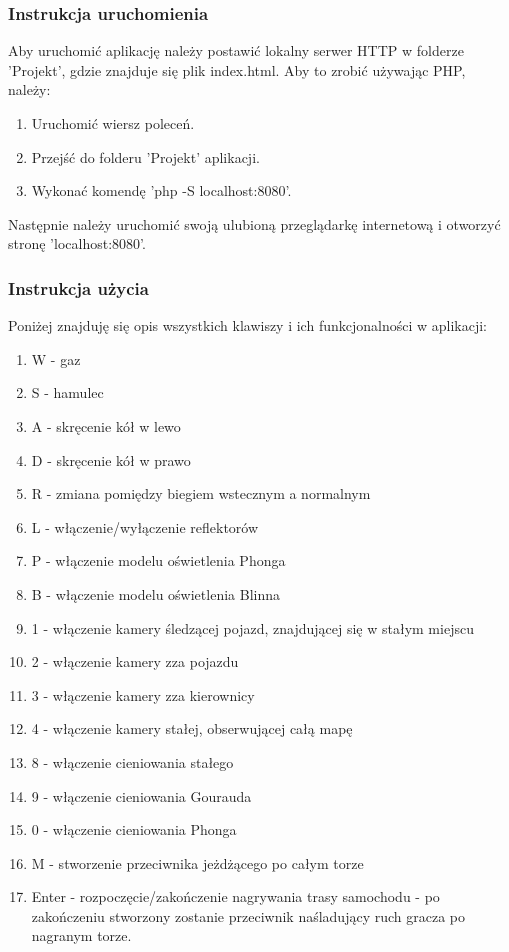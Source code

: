 \documentclass[11pt]{article}
\let\Oldsubsubsection\subsubsection
\renewcommand{\subsubsection}{\FloatBarrier\Oldsubsubsection}
\begin{document}
\subsubsection{Instrukcja uruchomienia}
\par
Aby uruchomić aplikację należy postawić lokalny serwer HTTP w folderze 'Projekt', gdzie znajduje się plik index.html. Aby to zrobić używając PHP, należy:
\begin{enumerate}
\item Uruchomić wiersz poleceń.
\item Przejść do folderu 'Projekt' aplikacji.
\item Wykonać komendę 'php -S localhost:8080'.
\end{enumerate}
Następnie należy uruchomić swoją ulubioną przeglądarkę internetową i otworzyć stronę 'localhost:8080'.

\subsubsection{Instrukcja użycia}
\par Poniżej znajduję się opis wszystkich klawiszy i ich funkcjonalności w aplikacji:
\begin{enumerate}
\item W - gaz
\item S - hamulec
\item A - skręcenie kół w lewo
\item D - skręcenie kół w prawo
\item R - zmiana pomiędzy biegiem wstecznym a normalnym
\item L - włączenie/wyłączenie reflektorów
\item P - włączenie modelu oświetlenia Phonga
\item B - włączenie modelu oświetlenia Blinna
\item 1 - włączenie kamery śledzącej pojazd, znajdującej się w stałym miejscu
\item 2 - włączenie kamery zza pojazdu
\item 3 - włączenie kamery zza kierownicy
\item 4 - włączenie kamery stałej, obserwującej całą mapę
\item 8 - włączenie cieniowania stałego
\item 9 - włączenie cieniowania Gourauda
\item 0 - włączenie cieniowania Phonga
\item M - stworzenie przeciwnika jeżdżącego po całym torze
\item Enter - rozpoczęcie/zakończenie nagrywania trasy samochodu - po zakończeniu stworzony zostanie przeciwnik naśladujący ruch gracza po nagranym torze.
\end{enumerate}
\end{document}
